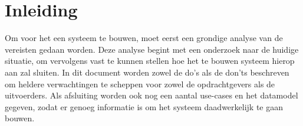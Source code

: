 \section{Inleiding}
\label{inleiding}

Om voor het \casamproject een systeem te bouwen,
moet eerst een grondige analyse van de vereisten gedaan worden.
Deze analyse begint met een onderzoek naar de huidige situatie,
om vervolgens vast te kunnen stellen hoe het te bouwen systeem hierop aan zal sluiten.
In dit document worden zowel de do's als de don'ts beschreven om heldere verwachtingen te scheppen
voor zowel de opdrachtgevers als de uitvoerders.
Als afsluiting worden ook nog een aantal use-cases en het datamodel gegeven, zodat er genoeg informatie is om het systeem daadwerkelijk te gaan bouwen.
